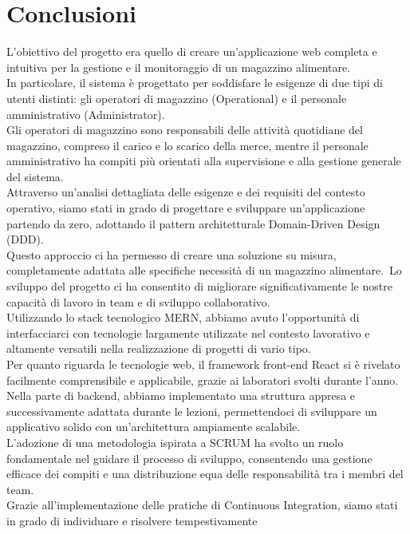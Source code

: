 \newpage
\section{Conclusioni}

L’obiettivo del progetto era quello di creare un’applicazione web completa e intuitiva per la gestione e il monitoraggio di un magazzino alimentare.
\\In particolare, il sistema è progettato per soddisfare le esigenze di due tipi di utenti distinti: gli operatori di
magazzino (Operational) e il personale amministrativo (Administrator).\\ Gli operatori di magazzino sono responsabili
delle attività quotidiane del magazzino, compreso il carico e lo scarico della merce, mentre il personale amministrativo
ha compiti più orientati alla supervisione e alla gestione generale del sistema.\\
Attraverso un'analisi dettagliata delle esigenze e dei requisiti del contesto operativo, siamo stati in grado di
progettare e sviluppare un'applicazione partendo da zero, adottando il pattern architetturale Domain-Driven Design (DDD).\\
Questo approccio ci ha permesso di creare una soluzione su misura, completamente adattata alle specifiche necessità di un magazzino alimentare.\
Lo sviluppo del progetto ci ha consentito di migliorare significativamente le nostre capacità di lavoro in team e di sviluppo collaborativo.\\
Utilizzando lo stack tecnologico MERN, abbiamo avuto l'opportunità di interfacciarci con tecnologie largamente utilizzate nel contesto lavorativo
e altamente versatili nella realizzazione di progetti di vario tipo.\\
Per quanto riguarda le tecnologie web, il framework front-end React si è rivelato facilmente comprensibile e applicabile,
grazie ai laboratori svolti durante l'anno. Nella parte di backend, abbiamo implementato una struttura appresa e successivamente
adattata durante le lezioni, permettendoci di sviluppare un applicativo solido con un'architettura ampiamente scalabile.\\
L'adozione di una metodologia ispirata a SCRUM ha svolto un ruolo fondamentale nel guidare il processo di sviluppo,
consentendo una gestione efficace dei compiti e una distribuzione equa delle responsabilità tra i membri del team.\\Grazie
all'implementazione delle pratiche di Continuous Integration, siamo stati in grado di individuare e risolvere tempestivamente
